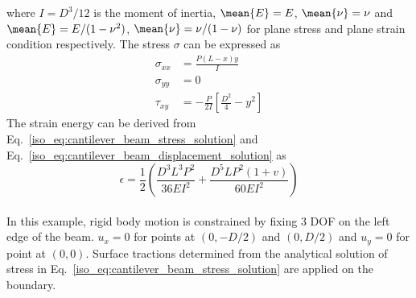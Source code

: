 %
where $I=D^3/12$ is the moment of inertia, $\mean{E}=E$, $\mean{\nu}=\nu$ and $\mean{E}=E/(1-\nu^2)$, $\mean{\nu}=\nu/(1-\nu)$ for plane stress and plane strain condition respectively.
The stress $\sigma$ can be expressed as \citep{Aug2008}
    \begin{subequations}
    \begin{align}
        \sigma_{xx} &= \frac{P(L-x)y}{I} \\
        \sigma_{yy} &= 0 \\
        \tau_{xy} &= -\frac{P}{2I} \left[
            \frac{D^2}{4} - y^2
        \right]
    \end{align}
    \label{iso_eq:cantilever_beam_stress_solution}
    \end{subequations}
%
The strain energy can be derived from Eq.~\ref{iso_eq:cantilever_beam_stress_solution} and Eq.~\ref{iso_eq:cantilever_beam_displacement_solution} as
\begin{equation}
\epsilon = 
    \frac{1}{2} \left(
        \frac{D^3 L^3 P^2}{36EI^2} + 
        \frac{D^5LP^2(1+v)}{60EI^2}
    \right)
    \label{iso_eq:cantilever_beam_energy_solution}
\end{equation}
\paragraph{}
In this example, rigid body motion is constrained by fixing 3 DOF on the left edge of the beam.
$u_x=0$ for points at $(0,-D/2)$ and $(0,D/2)$ and $u_y =0$ for point at $(0,0)$.
Surface tractions determined from the analytical solution of stress in Eq.~\ref{iso_eq:cantilever_beam_stress_solution} are applied on the boundary.


